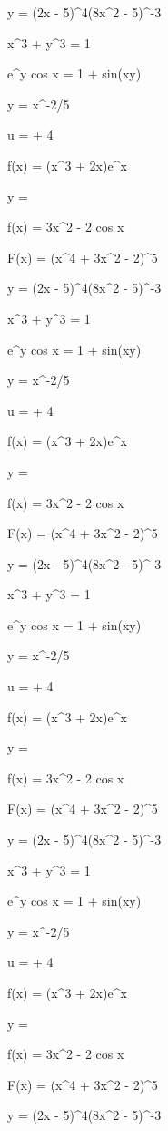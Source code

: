 \documentclass[11pt,a4paper]{article}
\begin{document}
 y = (2x - 5)^4(8x^2 - 5)^{-3}

 x^3 + y^3 = 1

 e^y cos x = 1 + sin(xy)

y = x^{-2/5}

u =  + 4

f(x) = (x^3 + 2x)e^x

y = 

f(x) = 3x^2 - 2 cos x


 F(x) = (x^4 + 3x^2 - 2)^5

 y = (2x - 5)^4(8x^2 - 5)^{-3}

 x^3 + y^3 = 1

 e^y cos x = 1 + sin(xy)

y = x^{-2/5}

u =  + 4

f(x) = (x^3 + 2x)e^x

y = 

f(x) = 3x^2 - 2 cos x


 F(x) = (x^4 + 3x^2 - 2)^5

 y = (2x - 5)^4(8x^2 - 5)^{-3}

 x^3 + y^3 = 1

 e^y cos x = 1 + sin(xy)

y = x^{-2/5}

u =  + 4

f(x) = (x^3 + 2x)e^x

y = 

f(x) = 3x^2 - 2 cos x


 F(x) = (x^4 + 3x^2 - 2)^5

 y = (2x - 5)^4(8x^2 - 5)^{-3}

 x^3 + y^3 = 1

 e^y cos x = 1 + sin(xy)

y = x^{-2/5}

u =  + 4

f(x) = (x^3 + 2x)e^x

y = 

f(x) = 3x^2 - 2 cos x


 F(x) = (x^4 + 3x^2 - 2)^5

 y = (2x - 5)^4(8x^2 - 5)^{-3}
\end{document}
